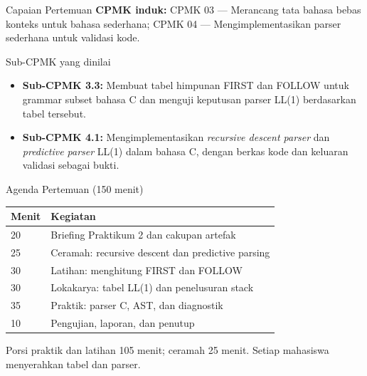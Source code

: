 \documentclass[aspectratio=169,10pt,t]{beamer}
\begin{document}

\begin{frame}{Capaian Pertemuan}
  \textbf{CPMK induk:} CPMK 03 --- Merancang tata bahasa bebas konteks
  untuk bahasa sederhana; CPMK 04 --- Mengimplementasikan parser
  sederhana untuk validasi kode.

  \vspace{2pt}
  \begin{block}{Sub-CPMK yang dinilai}
    \footnotesize
    \begin{itemize}
      \setlength{\itemsep}{1pt}
      \item \textbf{Sub-CPMK 3.3:} Membuat tabel himpunan FIRST dan
            FOLLOW untuk grammar subset bahasa C dan menguji keputusan
            parser LL(1) berdasarkan tabel tersebut.
      \item \textbf{Sub-CPMK 4.1:} Mengimplementasikan
            \textit{recursive descent parser} dan \textit{predictive
            parser} LL(1) dalam bahasa C, dengan berkas kode dan
            keluaran validasi sebagai bukti.
    \end{itemize}
  \end{block}
\end{frame}

\begin{frame}{Agenda Pertemuan (150 menit)}
  \small
  \begin{tabular}{@{}p{1.4cm}p{12.3cm}@{}}
    \toprule
    \textbf{Menit} & \textbf{Kegiatan} \\
    \midrule
    20 & Briefing Praktikum 2 dan cakupan artefak \\
    25 & Ceramah: recursive descent dan predictive parsing \\
    30 & Latihan: menghitung FIRST dan FOLLOW \\
    30 & Lokakarya: tabel LL(1) dan penelusuran stack \\
    35 & Praktik: parser C, AST, dan diagnostik \\
    10 & Pengujian, laporan, dan penutup \\
    \bottomrule
  \end{tabular}

  \vspace{6pt}
  {\scriptsize\color{ubbblue!75}Porsi praktik dan latihan 105 menit;
  ceramah 25 menit. Setiap mahasiswa menyerahkan tabel dan parser.}
\end{frame}
\end{document}
